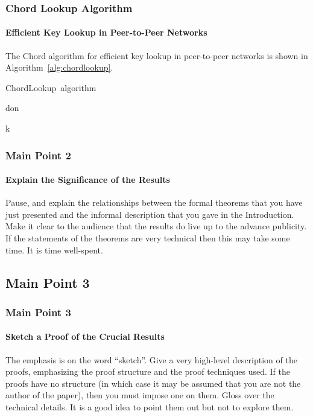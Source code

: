 \documentclass[11pt]{beamer}              %
\begin{document}
\begin{frame}
\frametitle{Chord Lookup Algorithm}
\framesubtitle{Efficient Key Lookup in Peer-to-Peer Networks}

The Chord algorithm for efficient key lookup in peer-to-peer networks is shown in Algorithm~\ref{alg:chordlookup}.

\begin{center}
\begin{algorithm}[H]
	\scriptsize
	\def\algorithmlabel{ChordLookup}
    \caption{\algorithmlabel\ algorithm}
    \label{alg:chordlookup}
    \begin{algorithmic}[1]
    	\Implement {\algorithmlabel}{cf} 
    	 {don} 
	\Need {}

                \State {}
        		
         {}
                \State {} 

         {  k }	
        		\State {} 
    \end{algorithmic}
\end{algorithm}
\end{center}

\end{frame}

\begin{frame}
\frametitle{Main Point 2}
\framesubtitle{Explain the Significance of the Results}
Pause, and explain the relationships between the formal theorems that you have just presented and the informal description that you gave in the Introduction. Make it clear to the audience that the results do live up to the advance publicity. If the statements of the theorems are very technical then this may take some time. It is time well-spent.

\end{frame}

\subsection{Main Point 3}
\begin{frame}
\frametitle{Main Point 3}
\framesubtitle{Sketch a Proof of the Crucial Results}
The emphasis is on the word ``sketch''. Give a very high-level description of the proofs, emphasizing the proof structure and the proof techniques used. If the proofs have no structure (in which case it may be assumed that you are not the author of the paper), then you must impose one on them. Gloss over the technical details. It is a good idea to point them out but not to explore them.
\end{frame}
\end{document}
